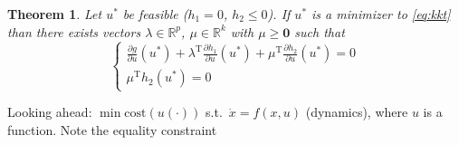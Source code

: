 \documentclass[letterpaper,12pt,titlepage]{report}
\newcommand{\trans}{^\text{T}}
\newcommand*\pder[2]{\frac{\partial #1}{\partial #2}}
\newcommand*\R{\mathbb{R}}
\theoremstyle{plain}
\newtheorem*{thm}{Theorem}
\theoremstyle{definition}
\begin{document}
\begin{thm}
  Let $u^*$ be feasible ($h_1=0$, $h_2\le0$). If $u^*$ is a minimizer to \eqref{eq:kkt} than there exists vectors $\lambda\in\R^p$, $\mu\in\R^k$ with $\mu\ge\bm 0$ such that
  \[ \begin{cases}
      \displaystyle \pder{g}{u}(u^*) + \lambda\trans \pder{h_1}{u}(u^*) + \mu\trans \pder{h_2}{u}(u^*) = 0 \\[1ex]
      \mu\trans h_2(u^*) = 0
    \end{cases} \]
\end{thm}

Looking ahead: $\min \text{cost}(u(\cdot))$ s.t.\ $\dot x = f(x,u)$ (dynamics), where $u$ is a function. Note the equality constraint
\end{document}
